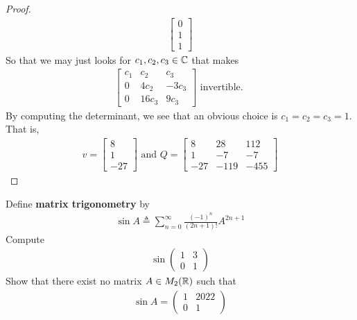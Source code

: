 \documentclass{report}
\begin{document}
\begin{proof}
\begin{align*}
\begin{bmatrix}
0 \\
1 \\
1
\end{bmatrix}
\end{align*}
So that we may just looks for $c_1,c_2,c_3\in\mathbb{C}$ that makes 
\begin{align*}
\begin{bmatrix}
  c_1 & c_2 & c_3 \\
  0 & 4c_2 & -3c_3 \\
  0 & 16c_3 & 9c_3
\end{bmatrix}\text{ invertible. }
\end{align*}
By computing the determinant, we see that an obvious choice is $c_1=c_2=c_3=1$. That is, 
\begin{align*}
v=\begin{bmatrix}
8 \\
1 \\
-27
\end{bmatrix}\text{ and }Q=\begin{bmatrix}
8 & 28 & 112 \\
1 & -7 & -7 \\
-27 & -119 & -455
\end{bmatrix}
\end{align*}
\end{proof}
\begin{question}{}{}
Define \textbf{matrix trigonometry} by 
\begin{align*}
\sin A \triangleq \sum_{n=0}^{\infty} \frac{(-1)^n}{(2n+1)!}A^{2n+1}
\end{align*}
Compute 
\begin{align*}
\sin \begin{pmatrix}
  1 & 3 \\
  0 & 1
\end{pmatrix}
\end{align*}
Show that there exist no matrix $A \in M_{2}(\mathbb{R})$ such that 
\begin{align*}
\sin A = \begin{pmatrix}
 1 & 2022 \\
 0 & 1
\end{pmatrix}
\end{align*}
\end{question}
\end{document}
